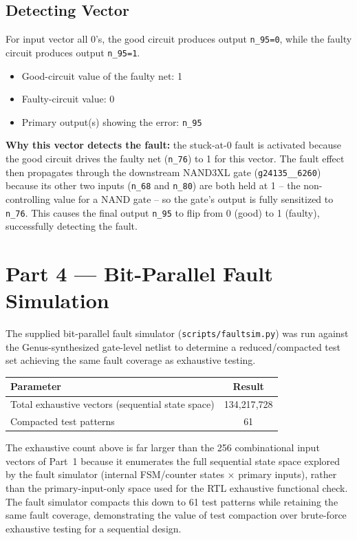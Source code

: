 \documentclass[11pt]{article}
\begin{document}
\subsection{Detecting Vector}
For input vector all 0's, the good circuit produces output \texttt{n\_95=0}, while the faulty
circuit produces output \texttt{n\_95=1}.
\begin{itemize}
    \item Good-circuit value of the faulty net: 1
    \item Faulty-circuit value: 0
    \item Primary output(s) showing the error: \texttt{n\_95}
\end{itemize}

\noindent\textbf{Why this vector detects the fault:} the stuck-at-0 fault is activated because the
good circuit drives the faulty net (\texttt{n\_76}) to 1 for this vector. The fault effect then
propagates through the downstream NAND3XL gate (\texttt{g24135\_\_6260}) because its other two
inputs (\texttt{n\_68} and \texttt{n\_80}) are both held at 1 -- the non-controlling value for a NAND
gate -- so the gate's output is fully sensitized to \texttt{n\_76}. This causes the final output
\texttt{n\_95} to flip from 0 (good) to 1 (faulty), successfully detecting the fault.

\section{Part 4 --- Bit-Parallel Fault Simulation}
The supplied bit-parallel fault simulator (\texttt{scripts/faultsim.py}) was run against the
Genus-synthesized gate-level netlist to determine a reduced/compacted test set achieving the same
fault coverage as exhaustive testing.

\begin{center}
\begin{tabular}{|l|c|}
\hline
\textbf{Parameter} & \textbf{Result} \\ \hline
Total exhaustive vectors (sequential state space) & 134{,}217{,}728 \\ \hline
Compacted test patterns & 61 \\ \hline
\end{tabular}
\end{center}
The exhaustive count above is far larger than the 256 combinational input vectors of
Part~1 because it enumerates the full sequential state space explored by the fault simulator
(internal FSM/counter states $\times$ primary inputs), rather than the primary-input-only space
used for the RTL exhaustive functional check. The fault simulator compacts this down to 61 test
patterns while retaining the same fault coverage, demonstrating the value of test compaction over
brute-force exhaustive testing for a sequential design.
\end{document}
